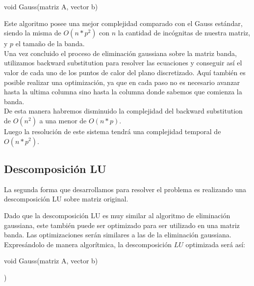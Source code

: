 \begin{algorithm}
\begin{algorithmic}[1]\parskip=1mm
\caption{void Gauss(matriz A, vector b)}
\end{algorithmic}
\end{algorithm}

Este algoritmo posee una mejor complejidad comparado con el Gauss estándar, siendo la misma de $O(n*p^2)$ con $n$ la cantidad de incógnitas de nuestra matriz, y $p$ el tamaño de la banda.
\\
Una vez concluido el proceso de eliminación gaussiana sobre la matriz banda, utilizamos backward substitution para resolver las ecuaciones y conseguir así el valor de cada uno de los puntos de calor del plano discretizado. Aquí también es posible realizar una optimización, ya que en cada paso no es necesario avanzar hasta la ultima columna sino hasta la columna donde sabemos que comienza la banda.
\\
De esta manera habremos disminuido la complejidad del backward substitution de $O(n^2)$ a una menor de $O(n*p)$.
\ExplicarMEJOR
\\
Luego la resolución de este sistema tendrá una complejidad temporal de $O(n*p^2)$.

\subsection{Descomposición LU}

La segunda forma que desarrollamos para resolver el problema es realizando una descomposición LU sobre matriz original.

Dado que la descomposición LU es muy similar al algoritmo de eliminación gaussiana, este también puede ser optimizado para ser utilizado en una matriz banda. Las optimizaciones serán similares a las de la eliminación gaussiana. Expresándolo de manera algorítmica, la descomposición $LU$ optimizada será así:

\begin{algorithm}
\begin{algorithmic}[1]\parskip=1mm
\caption{void Gauss(matriz A, vector b)}
   )
\end{algorithmic}
\end{algorithm}

